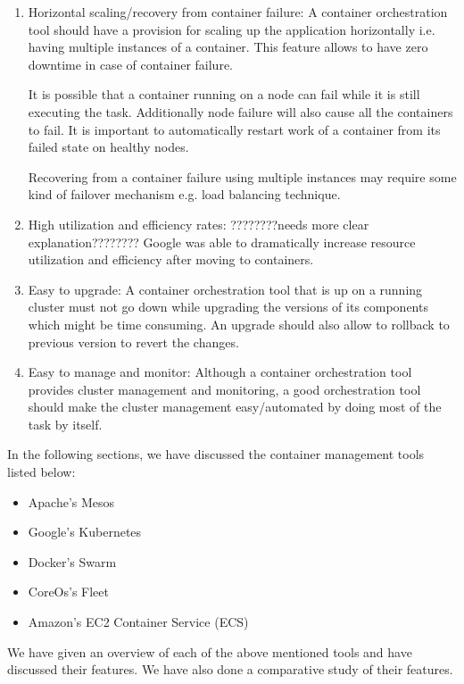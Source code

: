 \begin{enumerate}
\item  Horizontal scaling/recovery from container failure: A container orchestration tool should have a provision for scaling up the application horizontally i.e. having multiple instances of a container. This feature allows to have zero downtime in case of container failure.

It is possible that a container running on a node can fail while it is still executing the task. Additionally node failure will also cause all the containers to fail. It is important to automatically restart work of a container from its failed state on healthy nodes.

Recovering from a container failure using multiple instances may require some kind of failover mechanism e.g. load balancing technique.

\item  High utilization and efficiency rates: ????????needs more clear explanation????????
 Google was able to dramatically increase resource utilization and efficiency after moving to containers.


\item Easy to upgrade: A container orchestration tool that is up on a running cluster must not go down while upgrading the versions of its components which might be time consuming. An upgrade should also allow to rollback to previous version to revert the changes. 


\item Easy to manage and monitor: Although a container orchestration tool provides cluster management and monitoring, a good orchestration tool should make the cluster management easy/automated by doing most of the task by itself. 

\end{enumerate}



In the following sections, we have discussed the container management tools listed below:
\begin{itemize}
\item Apache's Mesos
\item Google's Kubernetes
\item Docker's Swarm
\item CoreOs's Fleet
\item Amazon's EC2 Container Service (ECS)
\end{itemize}
We have given an overview of each of the above mentioned tools and have discussed their features. We have also done a comparative study of their features.

